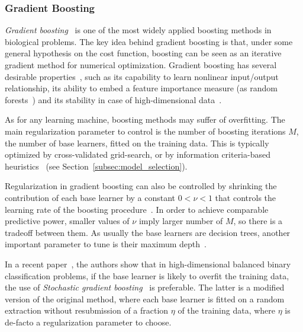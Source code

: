 	    \subsubsection{Gradient Boosting}
	    \textit{Gradient boosting}~\citep{friedman2001greedy}  is one of the most widely applied boosting methods in biological problems.
	    The key idea behind gradient boosting is that, under some general hypothesis on the cost function, boosting can be seen as an iterative gradient method for numerical optimization.
	    Gradient boosting has several desirable properties~\citep{mayr2014evolution}, such as its capability to learn nonlinear input/output relationship, its ability to embed a feature importance measure (as random forests~\citep{hastie2009elements}) and its stability in case of high-dimensional data~\citep{buehlmann2006boosting}.


	    As for any learning machine, boosting methods may suffer of overfitting. The main regularization parameter to control is the number of boosting iterations $M$, \ie the number of base learners, fitted on the training data. This is typically optimized by cross-validated grid-search, or by information criteria-based heuristics~\citep{tutz2006generalized, tutz2007boosting} (see Section~\ref{subsec:model_selection}).

	    Regularization in gradient boosting can also be controlled by shrinking the contribution of each base learner by a constant $0<\nu<1$ that controls the learning rate of the boosting procedure~\citep{hastie2009elements}. In order to achieve comparable predictive power, smaller values of $\nu$ imply larger number of $M$, so there is a tradeoff between them.
	    As usually the base learners are decision trees, another important parameter to tune is their maximum depth~\citep{hastie2009elements}.

	    In a recent paper~\citep{lusa2015boosting}, the authors show that in high-dimensional balanced binary classification problems, if the base learner is likely to overfit the training data, the use of \textit{Stochastic gradient boosting}~\citep{friedman2002stochastic} is preferable. The latter is a modified version of the original method, where each base learner is fitted on a random extraction without resubmission of a fraction $\eta$ of the training data, where $\eta$ is de-facto a regularization parameter to choose.

